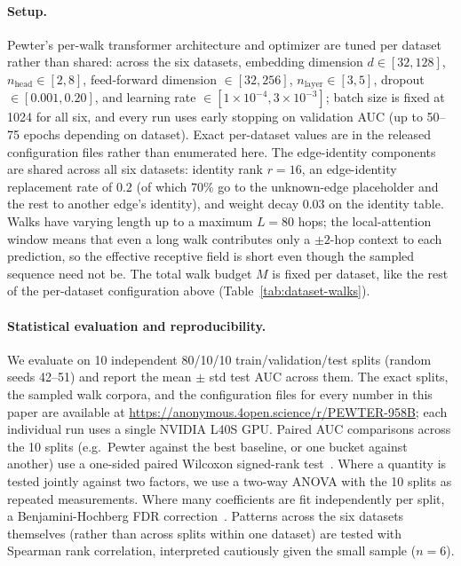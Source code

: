\documentclass[sigconf]{acmart}
\theoremstyle{plain}
\theoremstyle{definition}
\begin{document}
\paragraph{Setup.} Pewter's per-walk transformer architecture and optimizer are tuned per dataset rather than shared: across the six datasets, embedding dimension $d\in[32,128]$, $n_\text{head}\in[2,8]$, feed-forward dimension $\in[32,256]$, $n_\text{layer}\in[3,5]$, dropout $\in[0.001,0.20]$, and learning rate $\in[1\times10^{-4},3\times10^{-3}]$; batch size is fixed at 1024 for all six, and every run uses early stopping on validation AUC (up to 50--75 epochs depending on dataset). Exact per-dataset values are in the released configuration files rather than enumerated here. The edge-identity components are shared across all six datasets: identity rank $r=16$, an edge-identity replacement rate of $0.2$ (of which $70\%$ go to the unknown-edge placeholder and the rest to another edge's identity), and weight decay $0.03$ on the identity table. Walks have varying length up to a maximum $L=80$ hops; the local-attention window means that even a long walk contributes only a $\pm2$-hop context to each prediction, so the effective receptive field is short even though the sampled sequence need not be. The total walk budget $M$ is fixed per dataset, like the rest of the per-dataset configuration above (Table~\ref{tab:dataset-walks}).

\paragraph{Statistical evaluation and reproducibility.} We evaluate on 10 independent 80/10/10 train/validation/test splits (random seeds 42--51) and report the mean $\pm$ std test AUC across them. The exact splits, the sampled walk corpora, and the configuration files for every number in this paper are available at \url{https://anonymous.4open.science/r/PEWTER-958B}; each individual run uses a single NVIDIA L40S GPU. Paired AUC comparisons across the 10 splits (e.g.\ Pewter against the best baseline, or one bucket against another) use a one-sided paired Wilcoxon signed-rank test~\citep{wilcoxon1945individual}. Where a quantity is tested jointly against two factors, we use a two-way ANOVA with the 10 splits as repeated measurements.  Where many coefficients are fit independently per split, a Benjamini-Hochberg FDR correction~\citep{benjamini1995controlling}. Patterns across the six datasets themselves (rather than across splits within one dataset) are tested with Spearman rank correlation, interpreted cautiously given the small sample ($n=6$).
\end{document}
